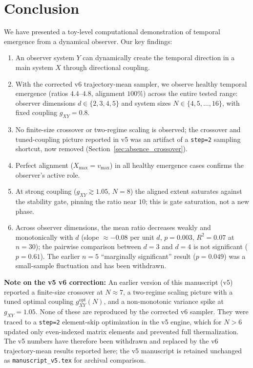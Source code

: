 \documentclass[12pt,a4paper]{article}
\begin{document}
\section{Conclusion}\label{sec:conclusion}

We have presented a toy-level computational demonstration of temporal 
emergence from a dynamical observer. Our key findings:

\begin{enumerate}[leftmargin=*]
\item An observer system $Y$ can dynamically create the temporal direction 
      in a main system $X$ through directional coupling.
\item With the corrected v6 trajectory-mean sampler, we observe healthy
      temporal emergence (ratios $4.4$--$4.8$, alignment $100\%$) across the
      entire tested range: observer dimensions $d \in \{2,3,4,5\}$ and system
      sizes $N \in \{4,5,\ldots,16\}$, with fixed coupling $g_{XY}=0.8$.
\item No finite-size crossover or two-regime scaling is observed; the
      crossover and tuned-coupling picture reported in v5 was an artifact of
      a \texttt{step=2} sampling shortcut, now removed (Section~\ref{sec:absence_crossover}).
\item Perfect alignment ($X_{\max} = v_{\max}$) in all healthy emergence cases 
      confirms the observer's active role.
\item At strong coupling ($g_{XY} \gtrsim 1.05$, $N=8$) the aligned extent
      saturates against the stability gate, pinning the ratio near $10$; this
      is gate saturation, not a new phase.
\item Across observer dimensions, the mean ratio decreases weakly and
      monotonically with $d$ (slope $\approx -0.08$ per unit $d$, $p=0.003$,
      $R^2=0.07$ at $n=30$); the pairwise comparison between $d=3$ and $d=4$
      is not significant ($p=0.61$). The earlier $n=5$ ``marginally
      significant'' result ($p=0.049$) was a small-sample fluctuation and has
      been withdrawn.
\end{enumerate}

\textbf{Note on the v5 \textrightarrow{} v6 correction:} An earlier version of
this manuscript (v5) reported a finite-size crossover at $N\approx 7$, a
two-regime scaling picture with a tuned optimal coupling
$g_{XY}^{\mathrm{opt}}(N)$, and a non-monotonic variance spike at
$g_{XY}=1.05$. None of these are reproduced by the corrected v6 sampler. They
were traced to a \texttt{step=2} element-skip optimization in the v5 engine,
which for $N>6$ updated only even-indexed matrix elements and prevented full
thermalization. The v5 numbers have therefore been withdrawn and replaced by
the v6 trajectory-mean results reported here; the v5 manuscript is retained
unchanged as \texttt{manuscript\_v5.tex} for archival comparison.
\end{document}

